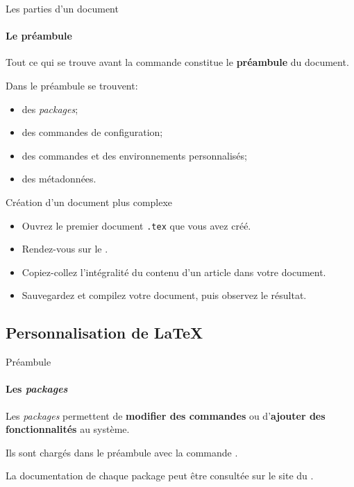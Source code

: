 \begin{frame}[c,fragile]{Les parties d'un document}
	\framesubtitle{Le préambule}
	Tout ce qui se trouve avant la commande  constitue le \textbf{préambule} du document.
	

	Dans le préambule se trouvent:
	\begin{itemize}
		\item des \emph{packages};
		\item des commandes de configuration;
		\item des commandes et des environnements personnalisés;
		\item des métadonnées.
	\end{itemize}
\end{frame}

\begin{frame}[c]{Création d'un document plus complexe}
	\begin{itemize}
		\item Ouvrez le premier document \texttt{.tex} que vous avez créé.
		\item Rendez-vous sur le .
		\item Copiez-collez l'intégralité du contenu d'un article dans votre document.
		\item Sauvegardez et compilez votre document, puis observez le résultat.
	\end{itemize}
\end{frame}

\subsection{Personnalisation de \LaTeX}

\begin{frame}[fragile,c]{Préambule}
	\framesubtitle{Les \emph{packages}}
	Les \emph{packages} permettent de \textbf{modifier des commandes} ou d’\textbf{ajouter des fonctionnalités} au système.

	Ils sont chargés dans le préambule avec la commande .


	La documentation de chaque package peut être consultée sur le site du
	.
\end{frame}

